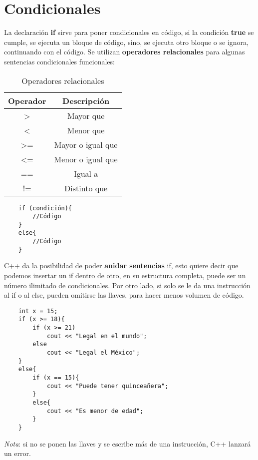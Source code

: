 \section{Condicionales}
La declaración \textbf{if} sirve para poner condicionales en código, si la condición \textbf{true} se cumple, se ejecuta un bloque de código, sino, se ejecuta otro bloque o se ignora, continuando con el código. Se utilizan \textbf{operadores relacionales} para algunas sentencias condicionales funcionales:
\begin{table}[ht]
    \begin{center}
        \caption{Operadores relacionales}
        \label{tab: 3}
        \begin{tabular}{c c}
            \hline
            \textbf{Operador}&\textbf{Descripción} \\
            \hline
            \textgreater&Mayor que \\
            \textless&Menor que \\
            \textgreater =&Mayor o igual que \\
            \textless =&Menor o igual que \\
            ==& Igual a \\
            !=& Distinto que \\
            \hline
        \end{tabular}
    \end{center}
\end{table}
\begin{lstlisting}
    if (condición){
        //Código
    }
    else{
        //Código
    }
\end{lstlisting}
C++ da la posibilidad de poder \textbf{anidar sentencias} if, esto quiere decir que podemos insertar un if dentro de otro, en su estructura completa, puede ser un número ilimitado de condicionales. Por otro lado, si solo se le da una instrucción al if o al else, pueden omitirse las llaves, para hacer menos volumen de código.
\begin{lstlisting}
    int x = 15;
    if (x >= 18){
        if (x >= 21)
            cout << "Legal en el mundo";
        else
            cout << "Legal el México";
    }
    else{
        if (x == 15){
            cout << "Puede tener quinceañera";
        }
        else{
            cout << "Es menor de edad";
        }
    }
\end{lstlisting}
\textit{Nota}: si no se ponen las llaves y se escribe más de una instrucción, C++ lanzará un error.



